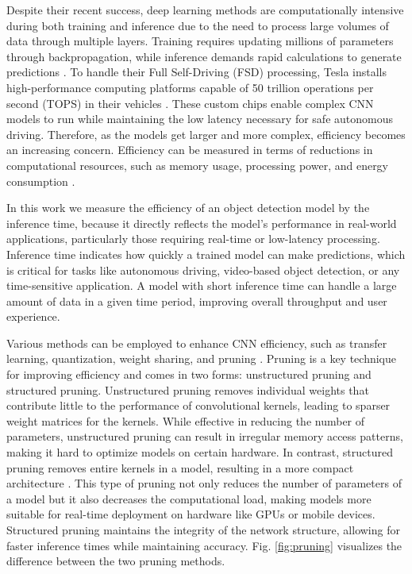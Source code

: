 \documentclass[journal,onecolumn,12pt]{IEEEtran}
\begin{document}
Despite their recent success, deep learning methods are computationally intensive during both training and inference due to the need to process large volumes of data through multiple layers. Training requires updating millions of parameters through backpropagation, while inference demands rapid calculations to generate predictions \cite{objDetect}. To handle their Full Self-Driving (FSD) processing, Tesla installs high-performance computing platforms capable of 50 trillion operations per second (TOPS) in their vehicles \cite{10588595}. These custom chips enable complex CNN models to run while maintaining the low latency necessary for safe autonomous driving. Therefore, as the models get larger and more complex, efficiency becomes an increasing concern. Efficiency can be measured in terms of reductions in computational resources, such as memory usage, processing power, and energy consumption \cite{electronics11060945}. 

In this work we measure the efficiency of an object detection model by the inference time, because it directly reflects the model’s performance in real-world applications, particularly those requiring real-time or low-latency processing. Inference time indicates how quickly a trained model can make predictions, which is critical for tasks like autonomous driving, video-based object detection, or any time-sensitive application. A model with short inference time can handle a large amount of data in a given time period, improving overall throughput and user experience.

Various methods can be employed to enhance CNN efficiency, such as transfer learning, quantization, weight sharing, and pruning \cite{HABIB20224244}. Pruning is a key technique for improving efficiency and comes in two forms: unstructured pruning and structured pruning. Unstructured pruning removes individual weights that contribute little to the performance of convolutional kernels, leading to sparser weight matrices for the kernels. While effective in reducing the number of parameters, unstructured pruning can result in irregular memory access patterns, making it hard to optimize models on certain hardware. In contrast, structured pruning removes entire kernels in a model, resulting in a more compact architecture \cite{beforehydra}. This type of pruning not only reduces the number of parameters of a model but it also decreases the computational load, making models more suitable for real-time deployment on hardware like GPUs or mobile devices. Structured pruning maintains the integrity of the network structure, allowing for faster inference times while maintaining accuracy. Fig. \ref{fig:pruning} visualizes the difference between the two pruning methods.
\end{document}
